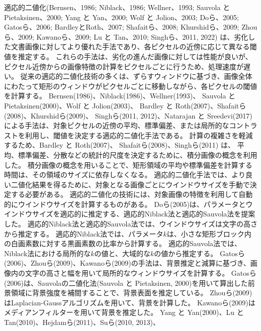 \documentclass[uplatex, twocolumn,10pt]{jsarticle}
\begin{document}
適応的二値化(Bernsen、1986\cite{bib9}; Niblack、1986\cite{bib10}; Wellner、1993\cite{bib11}; Sauvola と Pietaksinen、2000\cite{bib12};
Yang と Yan、2000;\cite{bib13} Wolf と Jolion、2003;\cite{bib14} Doら、2005;\cite{bib15}
Gatosら、2006;\cite{bib16} BardleyとRoth、2007;\cite{bib17} Shafaitら、2008;\cite{bib18}
Khurshidら、2009;\cite{bib19} Zhouら、2009;\cite{bib20} Kawanoら、2009;\cite{bib21}
Lu と Tan、2010;\cite{bib22} Singhら、2011, 2022\cite{bib23}\cite{bib24})
は、劣化した文書画像に対してより優れた手法であり、各ピクセルの近傍に応じて異なる閾値を推定する。
これらの手法は、劣化の進んだ画像に対しては性能が良いが、ピクセル近傍からの画像特徴の計算をピクセルごとに行うため、処理速度が遅い。
従来の適応的二値化技術の多くは、ずらすウィンドウに基づき、画像全体にわたって矩形のウィンドウがピクセルごとに移動しながら、各ピクセルの閾値を計算する。
Bernsen(1986)、Niblack(1986)、Wellner(1993)、
Sauvola と Pietaksinen(2000)、Wolf と Jolion(2003)、
Bardley と Roth(2007)、Shafaitら(2008)、Khurshidら(2009)、
Singhら(2011, 2012)、Natarajan と Sreedevi(2017)\cite{bib25}
による手法は、対象ピクセルの近傍の平均、標準偏差、または局所的なコントラストを利用し、閾値を決定する適応的二値化手法である。
計算の複雑さを軽減するため、Bardley と Roth(2007)、 Shafaitら(2008)、Singhら(2011) は、
平均、標準偏差、分散などの統計的尺度を決定するために、積分画像の概念を利用した。
積分画像の概念を用いることで、矩形領域の平均や標準偏差を計算する時間は、その領域のサイズに依存しなくなる。
適応的二値化手法では、より良い二値化結果を得るために、対象となる画像ごとにウインドウサイズを手動で決定する必要がある。
適応的二値化の技術には、対象画像の特徴を利用して自動的にウインドウサイズを計算するものがある。
Doら(2005)は、パラメータとウインドウサイズを適応的に推定する、適応的Niblack法と適応的Sauvola法を提案した。
適応的Niblack法と適応的Sauvola法では、ウインドウサイズは文字の高さから推定する。
適応的Niblack法では、パラメータ$k$は、小さな矩形ブロック内の白画素数に対する黒画素数の比率から計算する。
適応的Sauvola法では、Niblack法における局所的な$k$の値と、大域的な$k$の値から推定する。
Gatosら(2006)、Zhouら(2009)、Kawanoら(2009)の手法は、背景推定と減算に基づき、画像内の文字の高さと幅を用いて局所的なウィンドウサイズを計算する。
Gatosら(2006)は、Sauvolaの二値化法(Sauvola と Pietaksinen, 2000)を用いて算出した前景領域に背景強度を補間することで、背景表面を推定している。
Zhouら(2009)はLaplacian-Gaussアルゴリズムを用いて、背景を計算した。
Kawanoら(2009)はメディアンフィルターを用いて背景を推定した。
Yang と Yan(2000)、Lu と Tan(2010)、Hejdamら(2011)、Suら(2010, 2013)、
\end{document}
